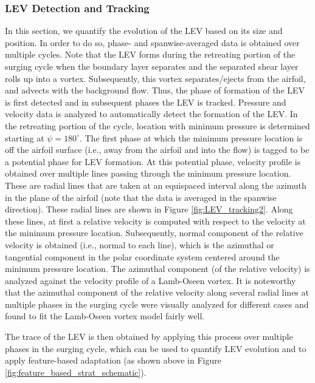 \subsubsection{LEV Detection and Tracking}
\label{sec:LEV_detect_track}


In this section, we quantify the evolution of the LEV based on its size and position.
In order to do so, phase- and spanwise-averaged data is obtained over multiple cycles.
Note that the LEV forms during the retreating portion of the surging cycle when the boundary layer separates and the separated shear layer rolls up into a vortex. Subsequently, this vortex separates/ejects from the airfoil, and advects with the background flow.
Thus, the phase of formation of the LEV is first detected and in subsequent phases the LEV is tracked.
Pressure and velocity data is analyzed to automatically detect the formation of the LEV.
In the retreating portion of the cycle, location with minimum pressure is determined starting at $\psi=180^\circ$.
The first phase at which the minimum pressure location is off the airfoil surface (i.e., away from the airfoil and into the flow) is tagged to be a potential phase for LEV formation.
At this potential phase, velocity profile is obtained over multiple lines passing through the minimum pressure location.
These are radial lines that are taken at an equispaced interval along the azimuth in the plane of the airfoil (note that the data is averaged in the spanwise direction).
These radial lines are shown in Figure \ref{fig:LEV_tracking2}.
Along these lines, at first a relative velocity is computed with respect to the velocity at the minimum pressure location.
Subsequently, normal component of the relative velocity is obtained (i.e., normal to each line), which is the azimuthal or tangential component in the polar coordinate system centered around the minimum pressure location.
The azimuthal component (of the relative velocity) is analyzed against the velocity profile of a Lamb-Oseen vortex.
It is noteworthy that the azimuthal component of the relative velocity along several radial lines at multiple phases in the surging cycle were visually analyzed for different cases and found to fit the Lamb-Oseen vortex model fairly well.

The trace of the LEV is then obtained by applying this process over multiple phases in the surging cycle, which can be used to quantify LEV evolution and to apply feature-based adaptation (as shown above in Figure \ref{fig:feature_based_strat_schematic}).

